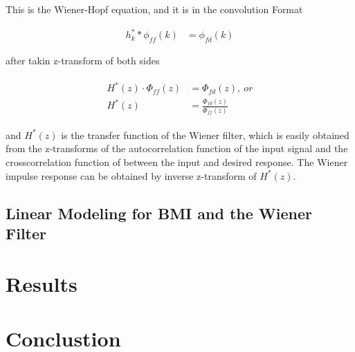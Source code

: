 \documentclass[8pt,a4paper]{article}
\begin{document}
\begin{multicols}{2}
This is the Wiener-Hopf equation, and it is in the convolution Format

\begin{align}
  h_{k}^{*} * \phi_{ff}(k) &= \phi_{fd}(k)
\end{align}

after takin z-transform of both sides

\begin{align}
  \begin{split}
    H^{*}(z) \cdot \Phi_{ff}(z) &= \Phi_{fd}(z),\ or \\
    H^{*}(z) &= \frac{ \Phi_{fd}(z) }{ \Phi_{ff}(z)  }
  \end{split}
\end{align}

and $H^{*}(z)$ is the transfer function of the Wiener filter, which is easily obtained from the z-transforms of the autocorrelation function of the input signal and the crosscorrelation function of between the input and desired response. 
The Wiener impulse response can be obtained by inverse z-transform of $H^{*}(z)$.

\subsection*{Linear Modeling for BMI and the Wiener Filter}


\section*{Results}


\section*{Conclustion}

 \label{sec:references}
\newpage


\end{multicols}
\end{document}
